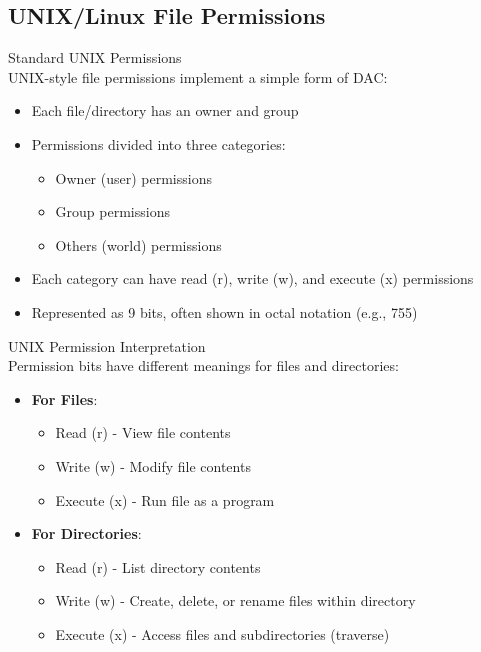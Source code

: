 \subsection{UNIX/Linux File Permissions}

\begin{definition}{Standard UNIX Permissions}\\
UNIX-style file permissions implement a simple form of DAC:
\begin{itemize}
    \item Each file/directory has an owner and group
    \item Permissions divided into three categories:
    \begin{itemize}
        \item Owner (user) permissions
        \item Group permissions
        \item Others (world) permissions
    \end{itemize}
    \item Each category can have read (r), write (w), and execute (x) permissions
    \item Represented as 9 bits, often shown in octal notation (e.g., 755)
\end{itemize}
\end{definition}

\begin{concept}{UNIX Permission Interpretation}\\
Permission bits have different meanings for files and directories:
\begin{itemize}
    \item \textbf{For Files}:
    \begin{itemize}
        \item Read (r) - View file contents
        \item Write (w) - Modify file contents
        \item Execute (x) - Run file as a program
    \end{itemize}
    \item \textbf{For Directories}:
    \begin{itemize}
        \item Read (r) - List directory contents
        \item Write (w) - Create, delete, or rename files within directory
        \item Execute (x) - Access files and subdirectories (traverse)
    \end{itemize}
\end{itemize}
\end{concept}



